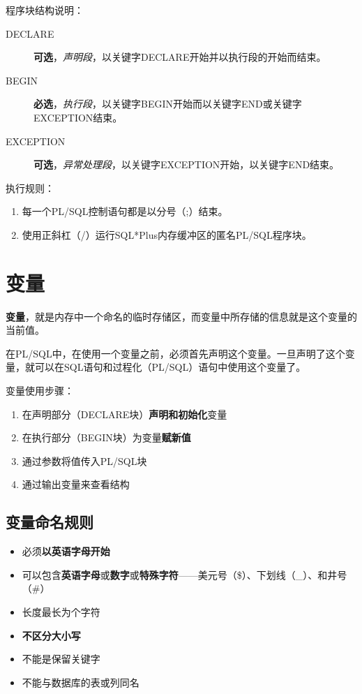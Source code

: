 \documentclass[11pt, a4paper, oneside, UTF8]{ctexbook}
\let\kaishu\relax %
\begin{document}
程序块结构说明：
\begin{description}
  \item[DECLARE] {\bfseries\kaishu 可选}，\textit{声明段}，以关键字DECLARE开始并以执行段的开始而结束。
  \item[BEGIN] {\bfseries\kaishu 必选}，\textit{执行段}，以关键字BEGIN开始而以关键字END或关键字EXCEPTION结束。
  \item[EXCEPTION] {\bfseries\kaishu 可选}，\textit{异常处理段}，以关键字EXCEPTION开始，以关键字END结束。
\end{description}
执行规则：
\begin{enumerate}
  \item 每一个PL/SQL控制语句都是以分号（;）结束。
  \item 使用正斜杠（/）运行SQL*Plus内存缓冲区的匿名PL/SQL程序块。
\end{enumerate}

\chapter{变量}
 {\bfseries\kaishu 变量}，就是内存中一个命名的临时存储区，而变量中所存储的信息就是这个变量的当前值。

在PL/SQL中，在使用一个变量之前，必须首先声明这个变量。一旦声明了这个变量，就可以在SQL语句和过程化（PL/SQL）语句中使用这个变量了。

变量使用步骤：
\begin{enumerate}
  \item 在声明部分（DECLARE块）\textbf{声明和初始化}变量
  \item 在执行部分（BEGIN块）为变量\textbf{赋新值}
  \item 通过参数将值传入PL/SQL块
  \item 通过输出变量来查看结构
\end{enumerate}
\section{变量命名规则}
\begin{itemize}
  \item 必须{\bfseries\kaishu 以英语字母开始}
  \item 可以包含{\bfseries\kaishu 英语字母}或{\bfseries\kaishu 数字}或{\bfseries\kaishu 特殊字符}——美元号（\$）、下划线（\_）、和井号（\#）
  \item 长度最长为{\bfseries\kaishu 30}个字符
  \item {\bfseries\kaishu 不区分大小写}
  \item 不能是保留关键字
  \item 不能与数据库的表或列同名
\end{itemize}
\end{document}
